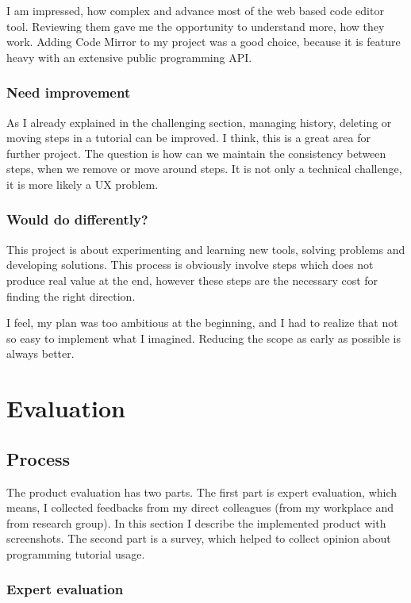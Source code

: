\documentclass[12pt, a4paper, oneside, openright, medskipamount]{report}
\begin{document}
I am impressed, how complex and advance most of the web based code editor tool. Reviewing them gave me the opportunity to understand more, how they work. Adding Code Mirror to my project was a good choice, because it is feature heavy with an extensive public programming API.

\subsection {Need improvement}

As I already explained in the challenging section, managing history, deleting or moving steps in a tutorial can be improved. I think, this is a great area for further project. The question is how can we maintain the consistency between steps, when we remove or move around steps. It is not only a technical challenge, it is more likely a UX problem.

\subsection {Would do differently?}

This project is about experimenting and learning new tools, solving problems and developing solutions. This process is obviously involve steps which does not produce real value at the end, however these steps are the necessary cost for finding the right direction.

I feel, my plan was too ambitious at the beginning, and I had to realize that not so easy to implement what I imagined. Reducing the scope as early as possible is always better.

\chapter{Evaluation}

\section{Process}

The product evaluation has two parts. The first part is expert evaluation, which means, I collected feedbacks from my direct colleagues (from my workplace and from research group). In this section I describe the implemented product with screenshots. The second part is a survey, which helped to collect opinion about programming tutorial usage.

\subsection{Expert evaluation}
\end{document}
